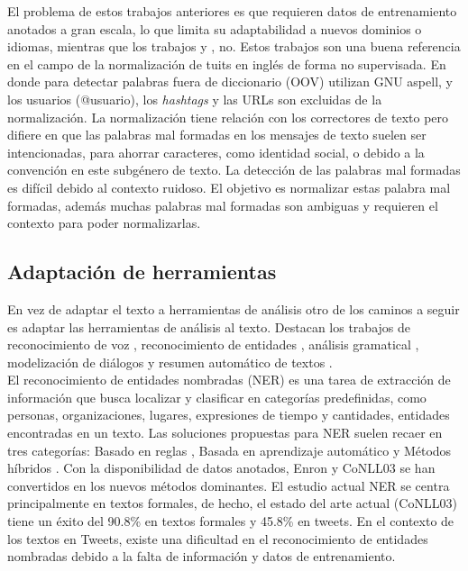 \documentclass[spanish,12pt, a4paper,twoside]{paper}
\begin{document}
El problema de estos trabajos anteriores es que requieren datos de entrenamiento anotados a gran escala, lo que limita su adaptabilidad a nuevos dominios o idiomas, mientras que los trabajos \cite{whitelaw:2009} y \cite{baldwin:2011}, no. Estos trabajos son una buena referencia en el campo de la normalización de tuits en inglés de forma no supervisada. En donde para detectar palabras fuera de diccionario (OOV) utilizan GNU aspell, y los usuarios (@usuario), los \textit{hashtags} y las URLs son excluidas de la normalización. La normalización tiene relación con los correctores de texto \cite{peterson:1980} pero difiere en que las palabras mal formadas en los mensajes de texto suelen ser intencionadas, para ahorrar caracteres, como identidad social, o debido a la convención en este subgénero de texto. La detección de las palabras mal formadas es difícil debido al contexto ruidoso. El objetivo es normalizar estas palabra mal formadas, además muchas palabras mal formadas son ambiguas y requieren el contexto para poder normalizarlas.

\subsection{Adaptación de herramientas}\label{sec:adaptaciondeherramientas}
En vez de adaptar el texto a herramientas de análisis otro de los caminos a seguir es adaptar las herramientas de análisis al texto. Destacan los trabajos de reconocimiento de voz \cite{gimpel:2011} \cite{owoputi:2013}, reconocimiento de entidades \cite{finin:2010} \cite{ritter:2011} \cite{liu:2011}, análisis gramatical \cite{foster:2011}, modelización de diálogos \cite{ritter:2010} y resumen automático de textos \cite{sharifi:2010}.\\

El reconocimiento de entidades nombradas (NER) es una tarea de extracción de información que busca localizar y clasificar en categorías predefinidas, como personas, organizaciones, lugares, expresiones de tiempo y cantidades, entidades encontradas en un texto. Las soluciones propuestas para NER suelen recaer en tres categorías: Basado en reglas \cite{krupkahausman:1998}, Basada en aprendizaje automático \cite{finkelmanning:2009} \cite{singh:2010} y Métodos híbridos \cite{jansche:2002}. Con la disponibilidad de datos anotados, Enron \cite{minkov:2005} y CoNLL03 \cite{tjong:2003} se han convertidos en los nuevos métodos dominantes. El estudio actual NER se centra principalmente en textos formales, de hecho, el estado del arte actual (CoNLL03) tiene un éxito del 90.8\% en textos formales y 45.8\% en tweets. En el contexto de los textos en Tweets, existe una dificultad en el reconocimiento de entidades nombradas debido a la falta de información y datos de entrenamiento.\\
\end{document}
